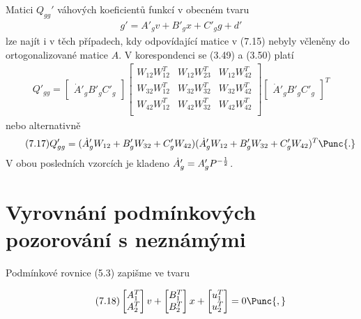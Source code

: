 Matici $Q_{gg}'$ váhových koeficientů funkcí v obecném tvaru
%
\begin{align*}
  \tag{7.15}
  g' = A'_gv + B'_gx + C'_gg + d'
\end{align*}
%
lze najít i v těch případech, kdy odpovídající matice v (7.15)
nebyly včleněny do ortogonalizované matice $A$. V korespondenci
se (3.49) a (3.50) platí
%
\begin{align*}
  Q'_{gg} =
  \begin{bmatrix}
    \dot A'_g B'_g C'_g
  \end{bmatrix}
  \begin{bmatrix}
    W_{12}W_{12}^T  &  W_{12}W_{23}^T  &  W_{12}W_{42}^T \\
    W_{32}W_{12}^T  &  W_{32}W_{32}^T  &  W_{32}W_{42}^T \\
    W_{42}W_{12}^T  &  W_{42}W_{32}^T  &  W_{42}W_{42}^T \\
  \end{bmatrix}
  \begin{bmatrix}
    \dot A'_g B'_g C'_g
  \end{bmatrix} ^T
\end{align*}
%
nebo alternativně
%
\begin{align*}
  \tag{7.17}
  Q'_{gg} = (\dot A'_gW_{12} + B'_gW_{32} + C'_gW_{42})
           (\dot A'_gW_{12} + B'_gW_{32} + C'_gW_{42})^T \Punc{.}
\end{align*}
%
V obou posledních vzorcích je kladeno $\dot A'_g = A'_gP^{-{1\over2}}$.



\section{Vyrovnání podmínkových pozorování s neznámými}

Podmínkové rovnice (5.3) zapišme ve tvaru

\begin{align*}
  \tag{7.18}
  \begin{bmatrix}
    A_1^T \\ A_2^T
  \end{bmatrix} v +
  \begin{bmatrix}
    B_1^T \\ B_2^T
  \end{bmatrix} x +
  \begin{bmatrix}
    u_1^T \\ u_2^T
  \end{bmatrix} = 0 \Punc{,}
\end{align*}

